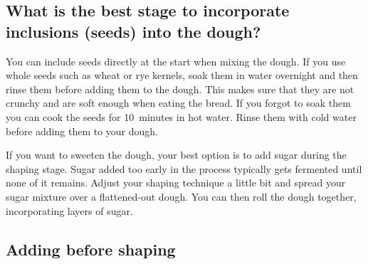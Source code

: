 \subsection[Incorporating seeds into the dough]{What is the best stage to
incorporate inclusions (seeds) into the dough?}%
\label{subec:incorporate-seeds}

You can include seeds directly at the start when mixing the dough. If you use
whole seeds such as wheat or rye kernels, soak them in water overnight and
then rinse them before adding them to the dough. This makes sure that they are
not crunchy and are soft enough when eating the bread. If you forgot to soak
them you can cook the seeds for 10~minutes in hot water. Rinse them with cold
water before adding them to your dough.

If you want to sweeten the dough, your best option is to add sugar during the
shaping stage. Sugar added too early in the process typically gets fermented
until none of it remains. Adjust your shaping technique a little bit and
spread your sugar mixture over a flattened-out dough. You can then roll the
dough together, incorporating layers of sugar.

\subsection{Adding before shaping}

